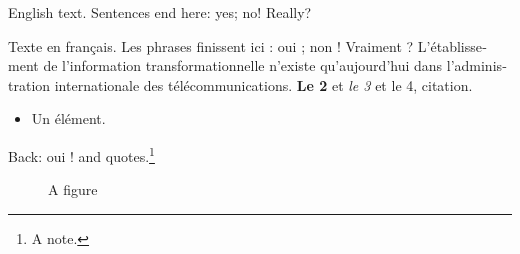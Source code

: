 \documentclass[12pt]{article}
\begin{document}
English text. Sentences end here: yes; no! Really?
\begin{otherlanguage}{french}
Texte en français. Les phrases finissent ici : oui ; non ! Vraiment ? L'établissement de l'information transformationnelle n'existe qu'aujourd'hui dans l'administration internationale des télécommunications.
\textbf{Le 2} et \textit{le 3} et {\footnotesize le 4}, \og citation\fg.
\begin{itemize}
\item Un élément.
\end{itemize}
\end{otherlanguage}
Back: \foreignlanguage{french}{oui !} and \og quotes\fg.\footnote{A note.}
\begin{figure}[h]
\caption{A figure}
\end{figure}
\end{document}
